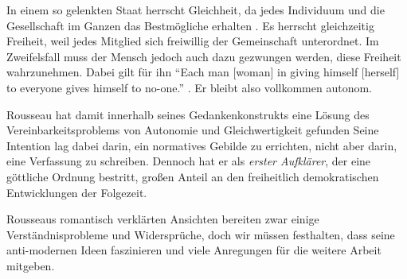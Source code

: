 In einem so gelenkten Staat herrscht Gleichheit, da jedes Individuum und die Gesellschaft im Ganzen das Bestmögliche erhalten \parencite[7]{Rousseau-1762-b}.
Es herrscht gleichzeitig Freiheit, weil jedes Mitglied sich freiwillig der Gemeinschaft unterordnet.
Im Zweifelsfall muss der Mensch jedoch auch dazu gezwungen werden, diese Freiheit wahrzunehmen.
Dabei gilt für ihn ``Each man [woman] in giving himself [herself] to everyone gives himself to no-one.'' \parencite[7][Anmerkung durch die Autoren]{Rousseau-1762-b}.
Er bleibt also vollkommen autonom.

Rousseau hat damit innerhalb seines Gedankenkonstrukts eine Lösung des Vereinbarkeitsproblems von Autonomie und Gleichwertigkeit gefunden
Seine Intention lag dabei darin, ein normatives Gebilde zu errichten, nicht aber darin, eine Verfassung zu schreiben.
Dennoch hat er als \emph{erster Aufklärer}, der eine göttliche Ordnung bestritt, großen Anteil an den freiheitlich demokratischen Entwicklungen der Folgezeit.

Rousseaus romantisch verklärten Ansichten bereiten zwar einige Verständnisprobleme und Widersprüche, doch wir müssen festhalten, dass seine anti-modernen Ideen faszinieren und viele Anregungen für die weitere Arbeit mitgeben.
